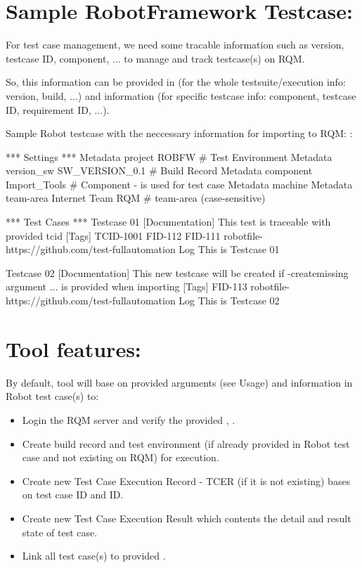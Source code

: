 %
%

\hypertarget{description-sample-robotframework-testcase}{%
\section{Sample RobotFramework
Testcase:}\label{description-sample-robotframework-testcase}}

For test case management, we need some tracable information such as
version, testcase ID, component, ... to manage and track testcase(s) on
RQM.

So, this information can be provided in  (for the whole
testsuite/execution info: version, build, ...) and \rcode{{[}Tags{]}}
information (for specific testcase info: component, testcase ID,
requirement ID, ...).

Sample Robot testcase with the neccessary information for importing to
RQM: :

\begin{robotcode}
*** Settings ***
Metadata   project      ROBFW             # Test Environment
Metadata   version_sw   SW_VERSION_0.1    # Build Record
Metadata   component    Import_Tools      # Component - is used for test case
Metadata   machine      %
Metadata   team-area    Internet Team RQM  # team-area (case-sensitive)

*** Test Cases ***
Testcase 01
   [Documentation]   This test is traceable with provided tcid
   [Tags]   TCID-1001   FID-112   FID-111    robotfile-https://github.com/test-fullautomation
   Log      This is Testcase 01

Testcase 02
   [Documentation]  This new testcase will be created if -createmissing argument
               ...  is provided when importing
   [Tags]   FID-113  robotfile-https://github.com/test-fullautomation
   Log      This is Testcase 02
\end{robotcode}

\hypertarget{description-tool-features}{%
\section{Tool features:}\label{description-tool-features}}

By default, tool will base on provided arguments (see
Usage) and  information in Robot test case(s)
to:

\begin{itemize}
\tightlist
\item
  Login the RQM server and verify the provided ,
  .
\item
  Create build record and test environment (if already provided in Robot
  test case and not existing on RQM) for execution.
\item
  Create new Test Case Execution Record - TCER (if it is not existing)
  bases on test case ID and  ID.
\item
  Create new Test Case Execution Result which contents the detail and
  result state of test case.
\item
  Link all test case(s) to provided .
\end{itemize}

